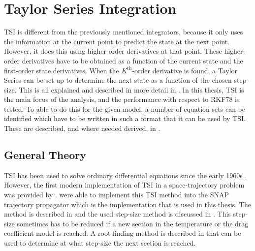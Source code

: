 \chapter{Taylor Series Integration} 

\label{ch:tsi}
\acf{TSI} is different from the previously mentioned integrators, because it only uses the information at the current point to predict the state at the next point. However, it does this using higher-order derivatives at that point. These higher-order derivatives have to be obtained as a function of the current state and the first-order state derivatives. When the $K^{\text{th}}$-order derivative is found, a Taylor Series can be set up to determine the next state as a function of the chosen step-size. This is all explained and described in more detail in . In this thesis, \ac{TSI} is the main focus of the analysis, and the performance with respect to \ac{RKF78} is tested. To able to do this for the given model, a number of equation sets can be identified which have to be written in such a format that it can be used by \ac{TSI}. These are described, and where needed derived, in .

\section{General Theory}
\label{sec:genTsiTheory}
\ac{TSI} has been used to solve ordinary differential equations since the early 1960s \citep{scott2008high}. However, the first modern implementation of \ac{TSI} in a space-trajectory problem was provided by \cite{montenbruck1992numerical}. \cite{scott2008high} were able to implement this \ac{TSI} method into the SNAP trajectory propagator which is the implementation that is used in this thesis. The method is described in  and the used step-size method is discussed in . This step-size sometimes has to be reduced if a new section in the temperature or the drag coefficient model is reached. A root-finding method is described in  that can be used to determine at what step-size the next section is reached.




